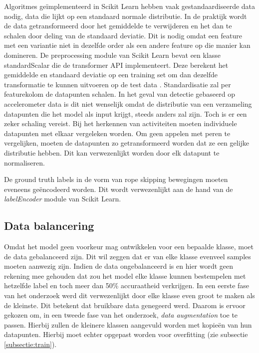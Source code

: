 Algoritmes geïmplementeerd in Scikit Learn hebben vaak gestandaardiseerde data nodig, data die lijkt op een standaard normale distributie. In de praktijk wordt de data getransformeerd door het gemiddelde te verwijderen en het dan te schalen door deling van de standaard deviatie.
Dit is nodig omdat een feature met een variantie niet in dezelfde order als een andere feature op die manier kan domineren. De preprocessing module van Scikit Learn bevat een klasse standardScalar die de transformer API implementeert. Deze berekent het gemiddelde en standaard deviatie op een training set om dan dezelfde transformatie te kunnen uitvoeren op de test data \cite{ref60}.
Standardisatie zal per featurekolom de datapunten schalen. In het geval van detectie gebaseerd op accelerometer data is dit niet wenselijk omdat de distributie van een verzameling datapunten die het model als input krijgt, steeds anders zal zijn. Toch is er een zeker schaling vereist.
Bij het herkennen van activiteiten moeten individuele datapunten met elkaar vergeleken worden. Om geen appelen met peren te vergelijken, moeten de datapunten zo getransformeerd worden dat ze een gelijke distributie hebben. Dit kan verwezenlijkt worden door elk datapunt te normaliseren.

De ground truth labels in de vorm van rope skipping bewegingen moeten eveneens geëncodeerd worden. Dit wordt verwezenlijkt aan de hand van de \textit{labelEncoder} module van Scikit Learn.

\subsection{Data balancering}
Omdat het model geen voorkeur mag ontwikkelen voor een bepaalde klasse, moet de data gebalanceerd zijn. Dit wil zeggen dat er van elke klasse evenveel samples moeten aanwezig zijn. Indien de data ongebalanceerd is en hier wordt geen rekening mee gehouden dat zou het model elke klasse kunnen bestempelen met hetzelfde label en toch meer dan 50\% accuraatheid verkrijgen.
In een eerste fase van het onderzoek werd dit verwezenlijkt door elke klasse even groot te maken als de kleinste. Dit betekent dat bruikbare data genegeerd werd. Daarom is ervoor gekozen om, in een tweede fase van het onderzoek, \textit{data augmentation} toe te passen. Hierbij zullen de kleinere klassen aangevuld worden met kopieën van hun datapunten. Hierbij moet echter opgepast worden voor overfitting (zie subsectie \ref{subsectie:train}).

